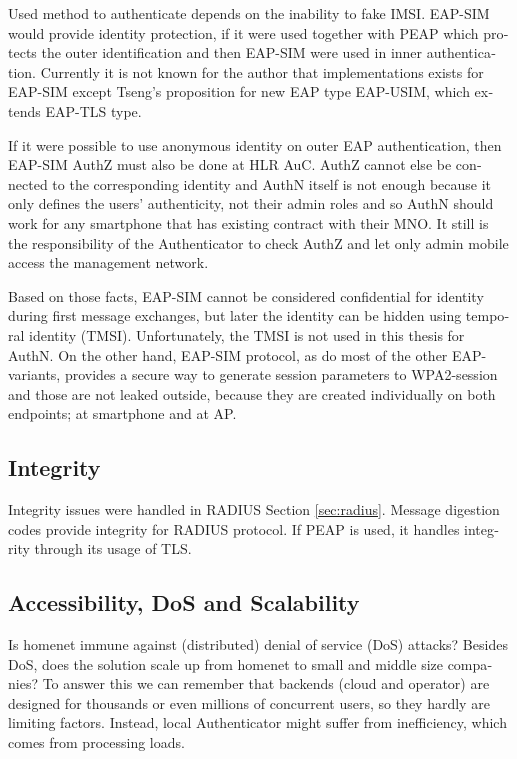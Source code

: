 \documentclass[12pt,a4paper,english]{tutthesis}
\begin{document}
\begin{otherlanguage}{english}
Used method to authenticate depends on the inability to fake IMSI.
EAP-SIM would provide identity protection, if it were used together
with PEAP which protects the outer identification  and
then EAP-SIM were used in inner authentication.
Currently it is not known for the author that implementations exists for
EAP-SIM  except Tseng's proposition\cite{tseng-usim} for  new EAP type
EAP-USIM, which extends EAP-TLS type.

If it were possible to use anonymous identity on outer EAP
authentication, then EAP-SIM AuthZ must also be done at HLR AuC.
AuthZ cannot else be connected to the corresponding
identity and AuthN itself is not enough because it only defines the users'
authenticity, not their admin roles and so 
AuthN should work for any  smartphone that has existing contract with
their MNO. 
It still is the responsibility of the Authenticator to 
check AuthZ  and let only admin mobile access the management network.









Based on those facts, EAP-SIM cannot be considered confidential for identity
during first message exchanges, but later the identity can be hidden
using temporal identity (TMSI). Unfortunately, the TMSI is not used in
this thesis for AuthN. 
On the other hand, EAP-SIM protocol, as do most of the other
EAP-variants, provides a secure way to
generate session parameters to WPA2-session and those are not leaked
outside, because they are created individually on both endpoints; 
at smartphone and at AP.
\subsection{Integrity}
\label{sec-6-5-2}
Integrity issues were handled in RADIUS Section \ref{sec:radius}.
Message digestion codes provide integrity for RADIUS protocol.
If PEAP is used, it handles integrity through its usage of
 TLS\cite{peap}.

\subsection{Accessibility, DoS and Scalability}
\label{sec-6-5-3}
Is homenet immune against (distributed) denial of service (DoS)
attacks? Besides DoS, does the solution scale up from homenet to
small and middle size companies?
To answer this we can remember that backends (cloud and operator) are
designed for thousands or even millions of concurrent users, so 
they hardly are limiting factors. Instead, local
Authenticator might suffer from inefficiency, which
comes from processing loads\cite{2009-lin-simefficiency}.



\end{otherlanguage}
\end{document}
